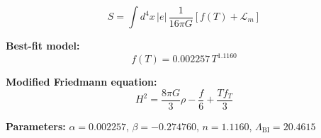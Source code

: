 
\begin{equation}
  S = \int d^4x \, |e| \, \frac{1}{16\pi G} \left[ f(T) + \mathcal{L}_m \right]
\end{equation}

\textbf{Best-fit model:}
\begin{equation}
  f(T) = 0.002257 \, T^{1.1160}
\end{equation}

\textbf{Modified Friedmann equation:}
\begin{equation}
  H^2 = \frac{8\pi G}{3} \rho - \frac{f}{6} + \frac{T f_T}{3}
\end{equation}

\textbf{Parameters:}
$\alpha = 0.002257$, \quad
$\beta = -0.274760$, \quad
$n = 1.1160$, \quad
$\Lambda_{\text{BI}} = 20.4615$